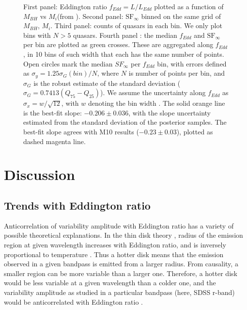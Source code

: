 \documentclass[twocolumn]{aastex62}
\begin{document}
\begin{figure*} %
\caption{First panel: Eddington ratio $f_{Edd} = L/L_{Edd}$ plotted as a function of $M_{BH}$  vs $M_{i}$(from \citealt{shen2011}).  Second panel: $\mathrm{SF}_{\infty}$  binned on the same grid of $M_{BH}$, $M_{i}$. Third panel:  counts of quasars in each bin. We only plot bins with $N>5$ quasars. Fourth panel : the median $f_{Edd}$ and $\mathrm{SF}_{\infty}$ per  bin are plotted as  green crosses. These are aggregated along $f_{Edd}$, in 10 bins of such  width that each has the same number of points. Open circles mark the median $SF_{\infty}$ per $f_{Edd}$ bin, with errors defined as $\sigma_{y} = 1.25  \sigma_{G}(bin) / N$, where $N$ is number of points per bin, and $\sigma_{G}$ is the robust estimate  of the standard deviation ($\sigma_{G} = 0.7413 (Q_{75}-Q_{25})$). We assume the uncertainty along $f_{Edd}$ as $\sigma_{x} = w/\sqrt{12} $, with $w$ denoting the bin width \citep{ivezic2014}. The solid orange line is the best-fit slope:  $-0.206 \pm 0.036$, with the slope uncertainty estimated from the standard deviation of the posterior samples. The best-fit slope agrees with M10 results ($-0.23 \pm 0.03$), plotted as dashed magenta line.}
\label{fig:eddington_ratio}
\end{figure*} 



%
%
%
%

\section{Discussion}
\label{sec:discussion}
\subsection{Trends with Eddington ratio}
Anticorrelation of  variability amplitude with Eddington ratio  has a variety of possible theoretical explanations. In the thin disk theory \citep{shakura1973, frank2002, netzer2013}, radius of the emission region at given wavelength increases with Eddington ratio, and is inversely proportional to temperature \citep{rakshit2017}. Thus a hotter disk means that the emission observed in a given bandpass is emitted from a larger radius. From causality, a smaller region can be more variable than a larger one. Therefore, a  hotter disk would be less variable at a given wavelength than a colder one, and  the variability amplitude as studied in a particular bandpass (here, SDSS r-band) would be anticorrelated with Eddington ratio \citep{fausnaugh2016,edelson2015}. 
\end{document}
